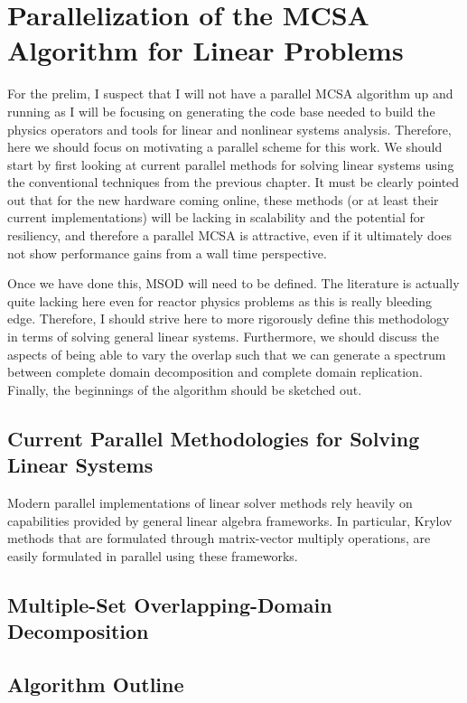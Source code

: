 \chapter{Parallelization of the MCSA Algorithm for Linear Problems}
\label{ch:parallel_mcsa}

For the prelim, I suspect that I will not have a parallel MCSA
algorithm up and running as I will be focusing on generating the code
base needed to build the physics operators and tools for linear and
nonlinear systems analysis. Therefore, here we should focus on
motivating a parallel scheme for this work. We should start by first
looking at current parallel methods for solving linear systems using
the conventional techniques from the previous chapter. It must be
clearly pointed out that for the new hardware coming online, these
methods (or at least their current implementations) will be lacking in
scalability and the potential for resiliency, and therefore a parallel
MCSA is attractive, even if it ultimately does not show performance
gains from a wall time perspective.

Once we have done this, MSOD will need to be defined. The literature
is actually quite lacking here even for reactor physics problems as
this is really bleeding edge. Therefore, I should strive here to more
rigorously define this methodology in terms of solving general linear
systems. Furthermore, we should discuss the aspects of being able to
vary the overlap such that we can generate a spectrum between complete
domain decomposition and complete domain replication. Finally, the
beginnings of the algorithm should be sketched out.

\section{Current Parallel Methodologies for Solving Linear Systems}
\label{sec:current_parallel_methods}
Modern parallel implementations of linear solver methods rely heavily
on capabilities provided by general linear algebra frameworks. In
particular, Krylov methods that are formulated through matrix-vector
multiply operations, are easily formulated in parallel using these
frameworks.

\section{Multiple-Set Overlapping-Domain Decomposition}
\label{sec:msod}

\section{Algorithm Outline}
\label{sec:parallel_mcsa_algorithm_outline}

